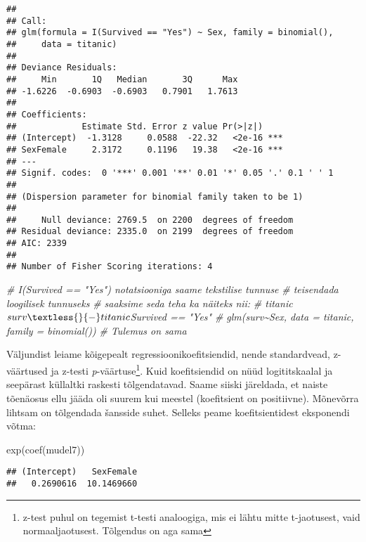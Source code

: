 \documentclass[
]{book}
\newenvironment{Shaded}{\begin{snugshade}}{\end{snugshade}}
\newcommand{\CommentTok}[1]{\textcolor[rgb]{0.56,0.35,0.01}{\textit{#1}}}
\newcommand{\FunctionTok}[1]{\textcolor[rgb]{0.00,0.00,0.00}{#1}}
\newcommand{\NormalTok}[1]{#1}
\begin{document}
\begin{verbatim}
## 
## Call:
## glm(formula = I(Survived == "Yes") ~ Sex, family = binomial(), 
##     data = titanic)
## 
## Deviance Residuals: 
##     Min       1Q   Median       3Q      Max  
## -1.6226  -0.6903  -0.6903   0.7901   1.7613  
## 
## Coefficients:
##             Estimate Std. Error z value Pr(>|z|)    
## (Intercept)  -1.3128     0.0588  -22.32   <2e-16 ***
## SexFemale     2.3172     0.1196   19.38   <2e-16 ***
## ---
## Signif. codes:  0 '***' 0.001 '**' 0.01 '*' 0.05 '.' 0.1 ' ' 1
## 
## (Dispersion parameter for binomial family taken to be 1)
## 
##     Null deviance: 2769.5  on 2200  degrees of freedom
## Residual deviance: 2335.0  on 2199  degrees of freedom
## AIC: 2339
## 
## Number of Fisher Scoring iterations: 4
\end{verbatim}

\begin{Shaded}
\begin{Highlighting}[]
\CommentTok{\# I(Survived == "Yes") notatsiooniga saame tekstilise tunnuse }
\CommentTok{\# teisendada loogilisek tunnuseks }
\CommentTok{\# saaksime seda teha ka näiteks nii:}
\CommentTok{\#   titanic$surv \textless{}{-} titanic$Survived == "Yes"}
\CommentTok{\#   glm(surv\textasciitilde{}Sex, data = titanic, family = binomial())}
\CommentTok{\# Tulemus on sama}
\end{Highlighting}
\end{Shaded}

Väljundist leiame kõigepealt regressioonikoefitsiendid, nende standardvead, z-väärtused ja z-testi \emph{p}-väärtuse\footnote{z-test puhul on tegemist t-testi analoogiga, mis ei lähtu mitte t-jaotusest, vaid normaaljaotusest. Tõlgendus on aga sama}. Kuid koefitsiendid on nüüd logititskaalal ja seepärast küllaltki raskesti tõlgendatavad. Saame siiski järeldada, et naiste tõenäosus ellu jääda oli suurem kui meestel (koefitsient on positiivne). Mõnevõrra lihtsam on tõlgendada šansside suhet. Selleks peame koefitsientidest eksponendi võtma:

\begin{Shaded}
\begin{Highlighting}[]
\FunctionTok{exp}\NormalTok{(}\FunctionTok{coef}\NormalTok{(mudel7))}
\end{Highlighting}
\end{Shaded}

\begin{verbatim}
## (Intercept)   SexFemale 
##   0.2690616  10.1469660
\end{verbatim}
\end{document}
